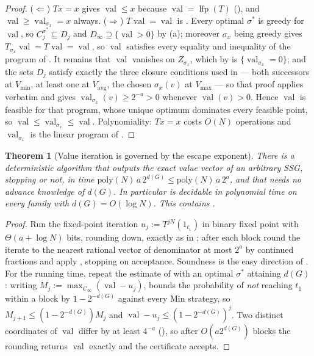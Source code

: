 \documentclass[11pt]{article}
\theoremstyle{plain}
\newtheorem{theorem}{Theorem}[section]
\theoremstyle{definition}
\DeclareMathOperator{\val}{val}
\DeclareMathOperator{\lfp}{lfp}
\newcommand{\Vmax}{V_{\max}}
\newcommand{\Vmin}{V_{\min}}
\newcommand{\Vavg}{V_{\mathrm{avg}}}
\begin{document}
\begin{proof}
($\Leftarrow$) $Tx=x$ gives $\val\le x$ because $\val=\lfp(T)$
(), and $\val\ge\val_{\sigma_x}=x$ always.
($\Rightarrow$) $T\val=\val$ is . Every optimal
$\sigma^\ast$ is greedy for $\val$, so $C_j^{\sigma^\ast}\subseteq D_j$
and $D_\infty\supseteq\{\val>0\}$ by (a); moreover
$\sigma_x$ being greedy gives $T_{\sigma_x}\val=T\val=\val$, so $\val$
satisfies every equality and inequality of the program of
. It remains that $\val$ vanishes on
$Z_{\sigma_x}$, which by  is $\{\val_{\sigma_x}=0\}$; and
the sets $D_j$ satisfy exactly the three closure conditions used in
 --- both successors at $\Vmin$, at least one at
$\Vavg$, the chosen $\sigma_x(v)$ at $\Vmax$ --- so that proof applies
verbatim and gives $\val_{\sigma_x}(v)\ge2^{-a}>0$ whenever $\val(v)>0$.
Hence $\val$ is feasible for that program, whose unique optimum dominates
every feasible point, so $\val\le\val_{\sigma_x}\le\val$.
Polynomiality: $Tx=x$ costs $O(N)$ operations and $\val_{\sigma_x}$ is the
linear program of .
\end{proof}

\begin{theorem}[Value iteration is governed by the escape
exponent]\label{thm:few-escape}
There is a deterministic algorithm that outputs the exact value vector of
an arbitrary SSG, stopping or not, in time
$\mathrm{poly}(N)\,a\,2^{d(G)}\le\mathrm{poly}(N)\,a\,2^{a}$, and that
needs no advance knowledge of $d(G)$. In particular  is
decidable in polynomial time on every family with $d(G)=O(\log N)$. This
contains .
\end{theorem}

\begin{proof}
Run the fixed-point iteration $u_j:=T^{jN}(1_{t_1})$ in binary fixed point
with $\Theta(a+\log N)$ bits, rounding down, exactly as in
; after each block round the iterate to the nearest
rational vector of denominator at most $2^{a}$ by continued fractions and
apply , stopping on acceptance. Soundness is the
easy direction of . For the running time, repeat the
estimate of  with an optimal $\sigma^\ast$ attaining
$d(G)$: writing $M_j:=\max_{C_\infty}(\val-u_j)$,
 bounds the probability of \emph{not} reaching
$t_1$ within a block by $1-2^{-d(G)}$ against every Min strategy, so
$M_{j+1}\le(1-2^{-d(G)})M_j$ and $\val-u_j\le(1-2^{-d(G)})^{j}$. Two
distinct coordinates of $\val$ differ by at least $4^{-a}$
(), so after $O(a2^{d(G)})$ blocks the
rounding returns $\val$ exactly and the certificate accepts.
\end{proof}
\end{document}
